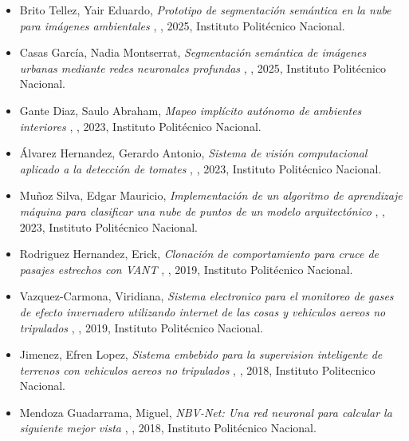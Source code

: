 \begin{itemize} 
\item Brito Tellez, Yair Eduardo, \textit{ Prototipo de segmentación semántica en la
nube para imágenes ambientales }, \href{ https://doi.org/10.13140/RG.2.2.16159.83364 }{\faFilePdfO}, 2025, Instituto Polit\'ecnico Nacional. 
\item Casas García, Nadia Montserrat, \textit{ Segmentación semántica de imágenes urbanas mediante redes neuronales profundas }, \href{  }{\faFilePdfO}, 2025, Instituto Polit\'ecnico Nacional. 
\item Gante Diaz, Saulo Abraham, \textit{ Mapeo implícito autónomo de ambientes interiores }, \href{ https://jivg.org/wp-content/uploads/2023/02/2023_maestria_Gante.pdf }{\faFilePdfO}, 2023, Instituto Polit\'ecnico Nacional. 
\item Álvarez Hernandez, Gerardo Antonio, \textit{ Sistema de visión computacional aplicado a
la detección de tomates }, \href{ https://jivg.org/wp-content/uploads/2024/01/2023_maestria_Alvarez.pdf }{\faFilePdfO}, 2023, Instituto Polit\'ecnico Nacional. 
\item Muñoz Silva, Edgar Mauricio, \textit{ Implementación de un algoritmo de aprendizaje máquina para clasificar una nube de puntos de un modelo arquitectónico }, \href{ https://jivg.org/wp-content/uploads/2024/01/2023_maestria_Silva.pdf }{\faFilePdfO}, 2023, Instituto Polit\'ecnico Nacional. 
\item Rodriguez Hernandez, Erick, \textit{ Clonación de comportamiento para cruce de pasajes estrechos con VANT }, \href{ https://jivasquez.files.wordpress.com/2019/08/tesiserhempastar.pdf }{\faFilePdfO}, 2019, Instituto Politécnico Nacional. 
\item Vazquez-Carmona, Viridiana, \textit{ Sistema electronico para el monitoreo de gases de efecto invernadero utilizando internet de las cosas y vehiculos aereos no tripulados }, \href{ https://jivasquez.files.wordpress.com/2020/09/2019_maestria_vazquez.pdf }{\faFilePdfO}, 2019, Instituto Polit\'ecnico Nacional. 
\item Jimenez, Efren Lopez, \textit{ Sistema embebido para la supervision inteligente de terrenos con vehiculos aereos no tripulados }, \href{ https://jivasquez.files.wordpress.com/2018/12/master_thesis_2018_lopez.pdf }{\faFilePdfO}, 2018, Instituto Politecnico Nacional. 
\item Mendoza Guadarrama, Miguel, \textit{ NBV-Net: Una red neuronal para calcular la siguiente mejor vista }, \href{ https://jivasquez.files.wordpress.com/2018/12/2018_maestria_Mendoza.pdf }{\faFilePdfO}, 2018, Instituto Politécnico Nacional. 
\end{itemize} 
